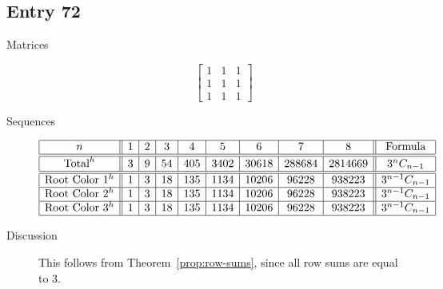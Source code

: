 \documentclass[12pt]{amsart}
\begin{document}
\subsection*{Entry 72}
\begin{description}
    \item[Matrices]
    
    \[\begin{bmatrix}
1 & 1 & 1 \\
1 & 1 & 1 \\
1 & 1 & 1
\end{bmatrix}\]
    \item[Sequences]\hspace*{\fill}\vspace{-0.5cm}
    \begin{center}
        \[
        \begin{array}{|c||c|c|c|c|c|c|c|c||c|}\hline
           n  & 1 & 2 & 3 & 4 & 5 & 6 & 7 & 8  & \text{Formula}\\\hline\hline
           \text{Total}^{h}  & 3 & 9 & 54 & 405 & 3402 & 30618 & 288684 & 2814669 & 
           3^{n}C_{n-1}\\\hline\hline
           \text{Root Color }1^h & 1 & 3 & 18 & 135 & 1134 & 10206 & 96228 & 938223 & 3^{n-1}C_{n-1}\\\hline
           \text{Root Color }2^h & 1 & 3 & 18 & 135 & 1134 & 10206 & 96228 & 938223 & 3^{n-1}C_{n-1}\\\hline
           \text{Root Color }3^h & 1 & 3 & 18 & 135 & 1134 & 10206 & 96228 & 938223 & 3^{n-1}C_{n-1}\\\hline
        \end{array}
        \]
    \end{center}
    


\item[Discussion] This follows from Theorem~\ref{prop:row-sums}, since all row sums are equal to $3$.
    
\end{description}
\end{document}
